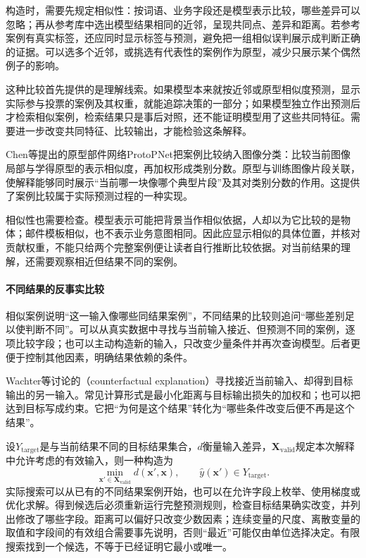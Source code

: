 构造时，需要先规定相似性：按词语、业务字段还是模型表示比较，哪些差异可以忽略；再从参考库中选出模型结果相同的近邻，呈现共同点、差异和距离。若参考案例有真实标签，还应同时显示标签与预测，避免把一组相似误判展示成判断正确的证据。可以选多个近邻，或挑选有代表性的案例作为原型，减少只展示某个偶然例子的影响。

这种比较首先提供的是理解线索。如果模型本来就按近邻或原型相似度预测，显示实际参与投票的案例及其权重，就能追踪决策的一部分；如果模型独立作出预测后才检索相似案例，检索结果只是事后对照，还不能证明模型用了这些共同特征。需要进一步改变共同特征、比较输出，才能检验这条解释。

Chen等提出的原型部件网络ProtoPNet把案例比较纳入图像分类：比较当前图像局部与学得原型的表示相似度，再加权形成类别分数。原型与训练图像片段关联，使解释能够同时展示“当前哪一块像哪个典型片段”及其对类别分数的作用。这提供了案例比较属于实际预测过程的一种实现。

相似性也需要检查。模型表示可能把背景当作相似依据，人却以为它比较的是物体；邮件模板相似，也不表示业务意图相同。因此应显示相似的具体位置，并核对贡献权重，不能只给两个完整案例便让读者自行推断比较依据。对当前结果的理解，还需要观察相近但结果不同的案例。

\paragraph{不同结果的反事实比较}
\label{sec:interpretability-local-counterfactual}

相似案例说明“这一输入像哪些同结果案例”，不同结果的比较则追问“哪些差别足以使判断不同”。可以从真实数据中寻找与当前输入接近、但预测不同的案例，逐项比较字段；也可以主动构造新的输入，只改变少量条件并再次查询模型。后者更便于控制其他因素，明确结果依赖的条件。

Wachter等讨论的（counterfactual explanation）寻找接近当前输入、却得到目标输出的另一输入。常见计算形式是最小化距离与目标输出损失的加权和；也可以把达到目标写成约束。它把“为何是这个结果”转化为“哪些条件改变后便不再是这个结果”。

设$Y_{\mathrm{target}}$是与当前结果不同的目标结果集合，$d$衡量输入差异，$\bm X_{\mathrm{valid}}$规定本次解释中允许考虑的有效输入，则一种构造为
\begin{equation}
 \min_{\bm{x}'\in\bm X_{\mathrm{valid}}}
 d(\bm{x}',\bm{x}),
 \qquad \hat y(\bm{x}')\in Y_{\mathrm{target}}.
 \label{eq:interpretability-counterfactual}
\end{equation}
实际搜索可以从已有的不同结果案例开始，也可以在允许字段上枚举、使用梯度或优化求解。得到候选后必须重新运行完整预测规则，检查目标结果确实改变，并列出修改了哪些字段。距离可以偏好只改变少数因素；连续变量的尺度、离散变量的取值和字段间的有效组合需要事先说明，否则“最近”可能仅由单位选择决定。有限搜索找到一个候选，不等于已经证明它最小或唯一。

